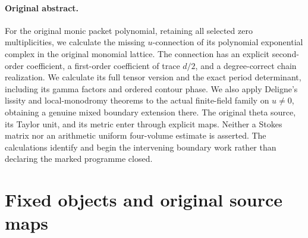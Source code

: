 \providecommand{\Tr}{\operatorname{Tr}}
\providecommand{\coker}{\operatorname{coker}}
\providecommand{\Spec}{\operatorname{Spec}}
\providecommand{\rem}{\operatorname{rem}}
\providecommand{\diag}{\operatorname{diag}}
\providecommand{\C}{\mathbb C}
\providecommand{\F}{\mathbb F}
\providecommand{\A}{\mathbb A}
\providecommand{\Gm}{{\mathbb G_m}}
\providecommand{\HH}{\mathcal H}
\providecommand{\BB}{\mathscr B}



\paragraph{Original abstract.}
For the original monic packet polynomial, retaining all selected zero
multiplicities, we calculate the missing $u$-connection of its polynomial
exponential complex in the original monomial lattice.  The connection has
an explicit second-order coefficient, a first-order coefficient of trace
$d/2$, and a degree-correct chain realization.  We calculate its full
tensor version and the exact period determinant, including its gamma
factors and ordered contour phase.  We also apply Deligne's lissity and
local-monodromy theorems to the actual finite-field family on $u\ne0$,
obtaining a genuine mixed boundary extension there.  The original theta
source, its Taylor unit, and its metric enter through explicit maps.
Neither a Stokes matrix nor an arithmetic uniform four-volume estimate is
asserted.  The calculations identify and begin the intervening boundary
work rather than declaring the marked programme closed.


\section{Fixed objects and original source maps}

